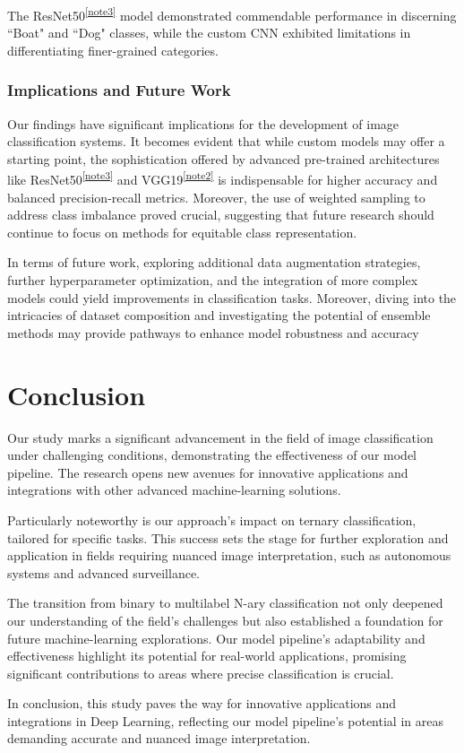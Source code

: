 \documentclass{article} %
\begin{document}
The ResNet50\textsuperscript{\ref{note3}} model demonstrated commendable performance in discerning ``Boat" and ``Dog" classes, while the custom CNN exhibited limitations in differentiating finer-grained categories.


\subsubsection{Implications and Future Work}
Our findings have significant implications for the development of image classification systems. It becomes evident that while custom models may offer a starting point, the sophistication offered by advanced pre-trained architectures like ResNet50\textsuperscript{\ref{note3}} and VGG19\textsuperscript{\ref{note2}} is indispensable for higher accuracy and balanced precision-recall metrics. Moreover, the use of weighted sampling to address class imbalance proved crucial, suggesting that future research should continue to focus on methods for equitable class representation.


In terms of future work, exploring additional data augmentation strategies, further hyperparameter optimization, and the integration of more complex models could yield improvements in classification tasks. Moreover, diving into the intricacies of dataset composition and investigating the potential of ensemble methods may provide pathways to enhance model robustness and accuracy


\section{Conclusion}
Our study marks a significant advancement in the field of image classification under challenging conditions, demonstrating the effectiveness of our model pipeline. The research opens new avenues for innovative applications and integrations with other advanced machine-learning solutions.


Particularly noteworthy is our approach's impact on ternary classification, tailored for specific tasks. This success sets the stage for further exploration and application in fields requiring nuanced image interpretation, such as autonomous systems and advanced surveillance.


The transition from binary to multilabel N-ary classification not only deepened our understanding of the field's challenges but also established a foundation for future machine-learning explorations. Our model pipeline's adaptability and effectiveness highlight its potential for real-world applications, promising significant contributions to areas where precise classification is crucial.


In conclusion, this study paves the way for innovative applications and integrations in Deep Learning, reflecting our model pipeline's potential in areas demanding accurate and nuanced image interpretation.


\newpage


\end{document}
